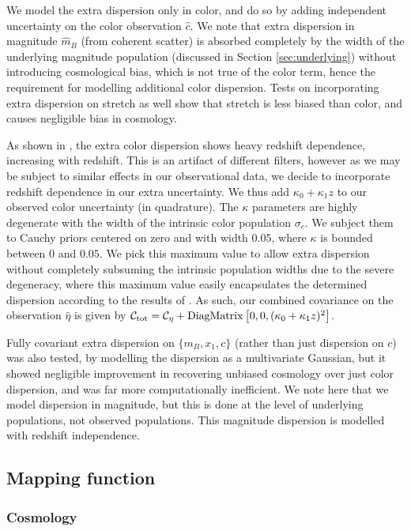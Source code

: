 \documentclass[a4paper,fleqn,usenatbib,manuscript]{emulateapj}
\begin{document}
We model the extra dispersion only in color, and do so by adding independent uncertainty on the color observation $\hat{c}$. We note that extra dispersion in magnitude $\hat{m}_B$ (from coherent scatter) is absorbed completely by the width of the underlying magnitude population (discussed in Section \ref{sec:underlying}) without introducing cosmological bias, which is not true of the color term, hence the requirement for modelling additional color dispersion. Tests on incorporating extra dispersion on stretch as well show that stretch is less biased than color, and causes negligible bias in cosmology.

As shown in \citep{Kessler2013}, the extra color dispersion shows heavy redshift dependence, increasing with redshift. This is an artifact of different filters, however as we may be subject to similar effects in our observational data, we decide to incorporate redshift dependence in our extra uncertainty. We thus add $\kappa_0 + \kappa_1 z$ to our observed color uncertainty (in quadrature). The $\kappa$ parameters are highly degenerate with the width of the intrinsic color population $\sigma_c$. We subject them to Cauchy priors centered on zero and with width $0.05$, where $\kappa$ is bounded between $0$ and $0.05$. We pick this maximum value to allow extra dispersion without completely subsuming the intrinsic population widths due to the severe degeneracy, where this maximum value easily encapsulates the determined dispersion according to the results of \citet{Kessler2013}. As such, our combined covariance on the observation $\hat{\eta}$ is given by $\mathcal{C}_{\rm tot} = \mathcal{C_\eta} + {\rm DiagMatrix}\left[0, 0, (\kappa_0 + \kappa_1 z)^2\right]$. 

Fully covariant extra dispersion on $\lbrace m_B, x_1, c \rbrace$ (rather than just dispersion on $c$) was also tested, by modelling the dispersion as a multivariate Gaussian, but it showed negligible improvement in recovering unbiased cosmology over just color dispersion, and was far more computationally inefficient. We note here that we model dispersion in magnitude, but this is done at the level of underlying populations, not observed populations. This magnitude dispersion is modelled with redshift independence.

\subsection{Mapping function}

\subsubsection{Cosmology}
\end{document}
